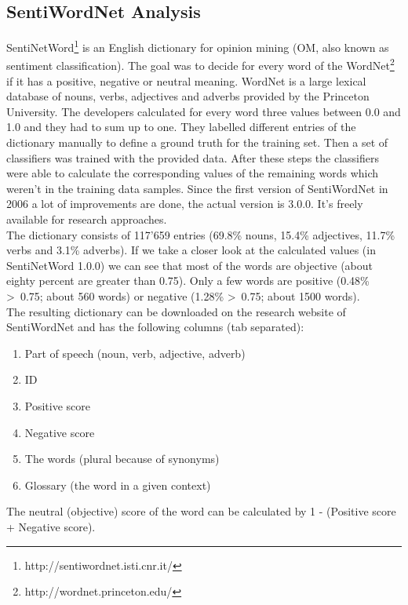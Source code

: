 \documentclass[a4paper]{article}
\begin{document}
\subsection{SentiWordNet Analysis}
SentiNetWord\footnote{http://sentiwordnet.isti.cnr.it/} is an English dictionary for opinion mining (OM, also known as sentiment classification). The goal was to decide for every word of the WordNet\footnote{http://wordnet.princeton.edu/} if it has a positive, negative or neutral meaning. WordNet is a large lexical database of nouns, verbs, adjectives and adverbs provided by the Princeton University. The developers calculated for every word three values between 0.0 and 1.0 and they had to sum up to one. They labelled different entries of the dictionary manually to define a ground truth for the training set. Then a set of classifiers was trained with the provided data. After these steps the classifiers were able to calculate the corresponding values of the remaining words which weren't in the training data samples. Since the first version of SentiWordNet in 2006 a lot of improvements are done, the actual version is 3.0.0. It's freely available for research approaches.\\
The dictionary consists of 117'659 entries (69.8\% nouns, 15.4\% adjectives, 11.7\% verbs and 3.1\% adverbs). If we take a closer look at the calculated values (in SentiNetWord 1.0.0) we can see that most of the words are objective (about eighty percent are greater than 0.75). Only a few words are positive (0.48\% \textgreater \ 0.75; about 560 words) or negative (1.28\% \textgreater \ 0.75; about 1500 words).\\
The resulting dictionary can be downloaded on the research website of SentiWordNet and has the following columns (tab separated):
\begin{enumerate}
	\item Part of speech (noun, verb, adjective, adverb)
  \item ID
	\item Positive score
	\item Negative score
	\item The words (plural because of synonyms)
	\item Glossary (the word in a given context)
\end{enumerate}
The neutral (objective) score of the word can be calculated by 1 - (Positive score + Negative score).
\end{document}
